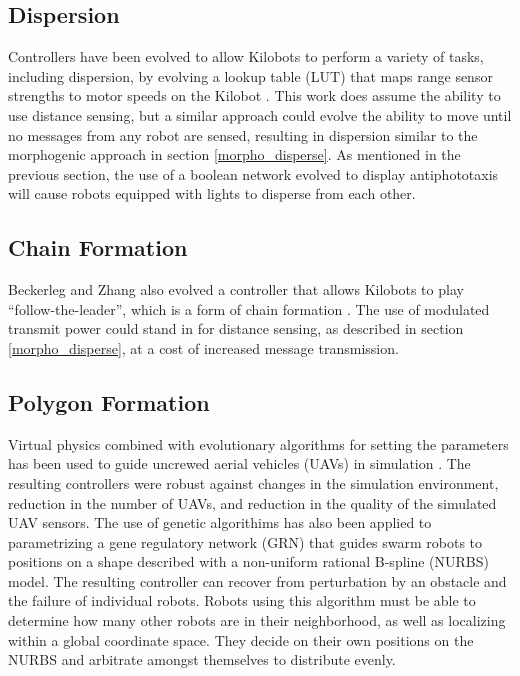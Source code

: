 \documentclass[]{article}
\begin{document}
\subsection{Dispersion}

Controllers have been evolved to allow Kilobots to perform a variety of tasks, including dispersion, by evolving a lookup table (LUT) that maps range sensor strengths to motor speeds on the Kilobot \cite{beckerleg2016evolving}.
This work does assume the ability to use distance sensing, but a similar approach could evolve the ability to move until no messages from any robot are sensed, resulting in dispersion similar to the morphogenic approach in section \ref{morpho_disperse}. 
As mentioned in the previous section, the use of a boolean network evolved to display antiphototaxis will cause robots equipped with lights to disperse from each other. 

\subsection{Chain Formation}

Beckerleg and Zhang also evolved a controller that allows Kilobots to play ``follow-the-leader'', which is a form of chain formation \cite{beckerleg2016evolving}. 
The use of modulated transmit power could stand in for distance sensing, as described in section \ref{morpho_disperse}, at a cost of increased message transmission. 

\subsection{Polygon Formation}

Virtual physics combined with evolutionary algorithms for setting the parameters has been used to guide uncrewed aerial vehicles (UAVs) in simulation \cite{spears2004overview}. 
The resulting controllers were robust against changes in the simulation environment, reduction in the number of UAVs, and reduction in the quality of the simulated UAV sensors. 
The use of genetic algorithims has also been applied to parametrizing a gene regulatory network (GRN) that guides swarm robots to positions on a shape described with a non-uniform rational B-spline (NURBS) model. 
The resulting controller can recover from perturbation by an obstacle and the failure of individual robots. 
Robots using this algorithm must be able to determine how many other robots are in their neighborhood, as well as localizing within a global coordinate space. 
They decide on their own positions on the NURBS and arbitrate amongst themselves to distribute evenly. 
\end{document}
